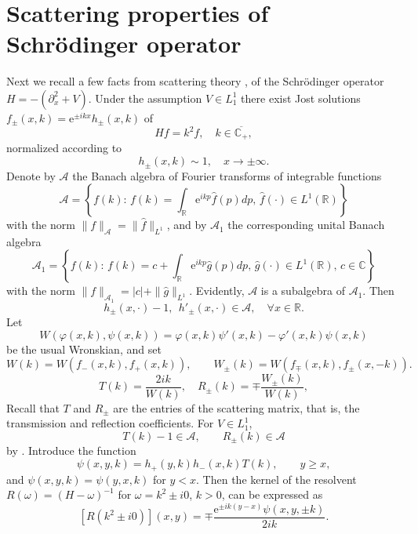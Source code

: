 \documentclass[reqno]{amsart}
\newcommand{\R}{{\mathbb R}}
\newcommand{\C}{{\mathbb C}}
\newcommand{\E}{\mathrm{e}}
\numberwithin{equation}{section}
\begin{document}
\section{ Scattering properties of Schr\"odinger operator}\label{scat}
Next we recall a few facts from scattering theory \cite{DT}, \cite{EKTM} of the Schr\"odinger operator $H=-(\partial^2_x+V)$.
Under the assumption
$V\in L^1_1$ there exist Jost solutions $f_\pm(x,k)=\E^{\pm ikx} h_\pm(x,k)$ of
\[
Hf=k^2f,\quad  k\in \overline{\C_+},
\]
normalized according to
\[
h_\pm(x,k)\sim  1,\quad x\to \pm \infty.
\]
Denote by  $\mathcal{A}$ the Banach algebra  of Fourier transforms of integrable functions
\[
\mathcal{A} = \left\{f(k):\,
f(k) = \int_\R \E^{ik p}\hat{f}(p)dp, \,\hat{f}(\cdot)\in L^1(\R) \right\}
\]
with the norm $\|f\|_{\mathcal{A}}= \|\hat{f}\|_{L^1}$, and by 
$\mathcal{A}_1$  the corresponding unital Banach algebra 
\[
\mathcal{A}_1 = \left\{f(k):\,
f(k) =c+ \int_\R \E^{ik p}\hat{g}(p)dp, \,\hat{g}(\cdot)\in L^1(\R),\,c\in\C\right\}
\]
with the norm $\|f\|_{\mathcal{A}_1}= |c|+\|\hat{g}\|_{L^1}$.
Evidently,  $\mathcal{A}$ is a subalgebra of $\mathcal{A}_1$.
Then
\begin{equation} \label{alg1}
h_\pm(x,\cdot) - 1,~~ h'_\pm(x,\cdot)\in\mathcal A,
\quad \forall x\in\R.
\end{equation}
Let
\[
W(\varphi(x,k),\psi(x,k))=\varphi(x,k)\psi'(x,k)-\varphi'(x,k)\psi(x,k)
\]
be the usual Wronskian, and set
\[
W(k)=W(f_-(x,k),f_+(x,k)),\qquad W_\pm(k)=W(f_{\mp}(x,k),f_{\pm}(x,- k)).
\]
\[
T(k)= \frac{2i k}{W(k)},\quad R_\pm(k)= \mp\frac{W_\pm(k)}{W(k)},
\]
Recall that $T$ and $R_\pm$ are the entries of the scattering matrix, that is, the transmission and reflection coefficients.
For $V\in L^1_1$,  
$$
T(k)-1\in\mathcal{A},\qquad R_\pm(k)\in\mathcal{A}
$$
by  \cite[Theorem 2.1]{EKTM}.  Introduce the function
\begin{equation}\label{psi}
\psi(x,y,k)= h_+(y,k)h_-(x,k) T(k), \qquad y\ge x,
\end{equation}
and $\psi(x,y,k)=\psi(y,x,k)$ for $y<x$.  
Then the kernel
of the resolvent $R(\omega)=(H-\omega)^{-1}$ for $\omega=k^2\pm i0$, $k>0$, can be expressed as 
\begin{equation}\label{resolvent}
[R(k^2\pm i0)](x,y) %
=\mp\frac{\E^{\pm ik(y-x)}\psi(x,y,\pm k)}{2ik}.
\end{equation}
\end{document}

